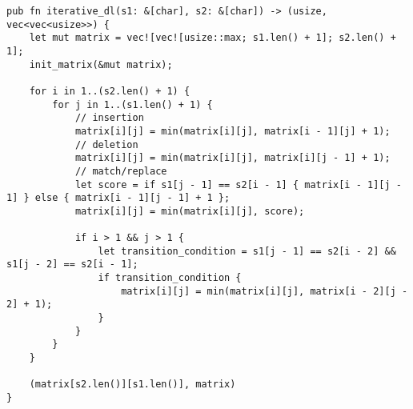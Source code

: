 \begin{lstlisting}[label=some-code,caption=Функция\, реализующая итеративный алгоритм нахождения расстояния дамерау-левенштейна]
pub fn iterative_dl(s1: &[char], s2: &[char]) -> (usize, vec<vec<usize>>) {
    let mut matrix = vec![vec![usize::max; s1.len() + 1]; s2.len() + 1];
    init_matrix(&mut matrix);

    for i in 1..(s2.len() + 1) {
        for j in 1..(s1.len() + 1) {
            // insertion
            matrix[i][j] = min(matrix[i][j], matrix[i - 1][j] + 1);
            // deletion
            matrix[i][j] = min(matrix[i][j], matrix[i][j - 1] + 1);
            // match/replace
            let score = if s1[j - 1] == s2[i - 1] { matrix[i - 1][j - 1] } else { matrix[i - 1][j - 1] + 1 };
            matrix[i][j] = min(matrix[i][j], score);

            if i > 1 && j > 1 {
                let transition_condition = s1[j - 1] == s2[i - 2] && s1[j - 2] == s2[i - 1];
                if transition_condition {
                    matrix[i][j] = min(matrix[i][j], matrix[i - 2][j - 2] + 1);
                }
            }
        }
    }

    (matrix[s2.len()][s1.len()], matrix)
}
\end{lstlisting}
